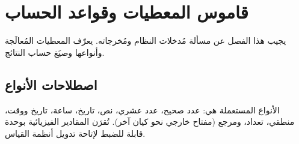 \chapter{قاموس المعطيات وقواعد الحساب}
يجيب هذا الفصل عن مسألة مُدخلات النظام ومُخرجاته. يعرّف المعطيات المُعالَجة
وأنواعها وصيَغ حساب النتائج.

\section{اصطلاحات الأنواع}
الأنواع المستعملة هي: عدد صحيح، عدد عشري، نص، تاريخ، ساعة، تاريخ ووقت، منطقي،
تعداد، ومرجع (مفتاح خارجي نحو كيان آخر). تُقرَن المقادير الفيزيائية بوحدة قابلة
للضبط لإتاحة تدويل أنظمة القياس.

